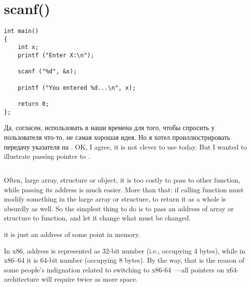 \section{scanf()}
\label{label_scanf}


\begin{lstlisting}
int main() 
{
	int x;
	printf ("Enter X:\n");

	scanf ("%d", &x);

	printf ("You entered %d...\n", x);

	return 0;
};
\end{lstlisting}

\IFRU
{Да, согласен, использовать \scanf в наши времена для того, чтобы спросить у пользователя что-то, 
не самая хорошая идея.
Но я хотел проиллюстрировать передачу указателя на \Tint.}
{OK, I agree, it is not clever to use \scanf today. But I wanted to illustrate passing pointer to \Tint.}

\subsection{}
\index{\CLanguageElements!\Pointers}

{Often, large array, structure or object, it is too costly to pass to other function, 
while passing its address is much easier.}
{More than that: if calling function must modify something in the large array or structure,
to return it as a whole is absurdly as well.}
{So the simplest thing to do is to pass an address of array or structure to function,
and let it change what must be changed.}

 \CCpp {}
{it is just an address of some point in memory.}

{In x86, address is represented as 32-bit number (i.e., occupying 4 bytes), while in x86--64 it is 64-bit number
(occupying 8 bytes).}
{By the way, that is the reason of some people's indignation related to switching to x86-64~---all pointers
on x64-architecture will require twice as more space.}

